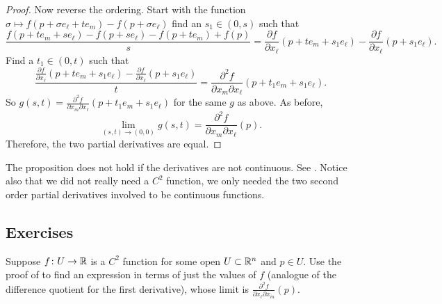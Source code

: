 \begin{proof}
Now reverse the ordering.  Start with
the function $\sigma \mapsto f(p+\sigma e_{\ell} + te_m)-f(p + \sigma
e_{\ell})$
find an $s_1 \in (0,s)$ such that
\begin{equation*}
\frac{f(p+te_m + se_{\ell})- f(p+s e_{\ell}) - f(p+t e_m)+f(p)}{s}
=
\frac{\partial f}{\partial x_{\ell}}(p + t e_m + s_1 e_{\ell})
-
\frac{\partial f}{\partial x_{\ell}}(p + s_1 e_{\ell}) .
\end{equation*}
Find a $t_1 \in (0,t)$ such that
\begin{equation*}
\frac{\frac{\partial f}{\partial x_{\ell}}(p + t e_m + s_1 e_{\ell})
-
\frac{\partial f}{\partial x_{\ell}}(p + s_1 e_{\ell})}{t}
=
\frac{\partial^2 f}{\partial x_m \partial x_{\ell}}(p + t_1 e_m + s_1
e_{\ell}) .
\end{equation*}
So $g(s,t) = \frac{\partial^2 f}{\partial x_m \partial
x_{\ell}}(p + t_1 e_m + s_1 e_{\ell})$ for the same $g$ as above.
As before,
\begin{equation*}
\lim_{(s,t) \to (0,0)} g(s,t) = 
\frac{\partial^2 f}{\partial x_m \partial x_{\ell}}(p) .
\end{equation*}
Therefore, the two partial derivatives are equal.
\end{proof}

The proposition does not hold if the derivatives are not
continuous.  See .
Notice also that we did not really need a $C^2$ function, we only needed the
two second order partial derivatives involved to be continuous functions.

\subsection{Exercises}

\begin{exercise}
Suppose $f \colon U \to {\mathbb{R}}$ is a $C^2$ function for some open $U \subset
{\mathbb{R}}^n$ and $p \in U$.
Use the proof of  to find an expression
in terms of just the values of $f$ (analogue of the difference quotient
for the first derivative), whose limit is
$\frac{\partial^2 f}{ \partial x_{\ell} \partial x_m}(p)$.
\end{exercise}

